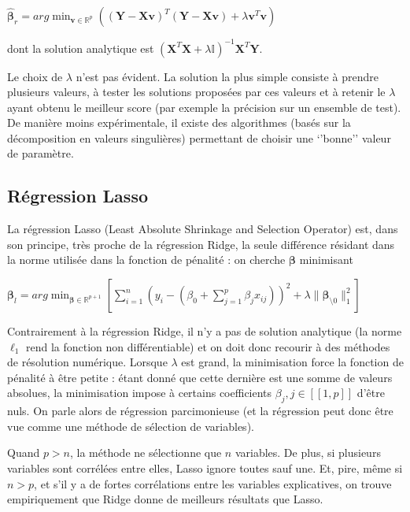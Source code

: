 \documentclass[letterpaper,10pt,english]{jupyterBook}
\begin{document}
\sphinxAtStartPar
\(\hat{\boldsymbol \beta}_r = arg\displaystyle\min_{\mathbf v\in\mathbb{R}^{p}} \left ((\mathbf Y-\mathbf X\mathbf v)^T(\mathbf Y-\mathbf X\mathbf v) + \lambda \mathbf v^T\mathbf v\right )\)

\sphinxAtStartPar
dont la solution analytique est \((\mathbf X^T\mathbf X + \lambda \mathbb{I})^{-1}\mathbf X^T\mathbf Y\).

\sphinxAtStartPar
Le choix de \(\lambda\) n’est pas évident. La solution la plus simple consiste à prendre plusieurs valeurs, à tester les solutions proposées par ces valeurs et à retenir le \(\lambda\) ayant obtenu le meilleur score (par exemple la précision sur un ensemble de test). De manière moins expérimentale, il existe des algorithmes (basés sur la décomposition en valeurs singulières) permettant de choisir une ‘’bonne’’ valeur de paramètre.


\subsection{Régression Lasso}
\label{\detokenize{regression:regression-lasso}}
\ignorespaces 
{}\ignorespaces 
\sphinxAtStartPar
La régression Lasso (Least Absolute Shrinkage and Selection Operator) est, dans son principe, très proche de la régression Ridge, la seule différence résidant dans la norme utilisée dans la fonction de pénalité : on cherche \(\boldsymbol\beta\) minimisant

\sphinxAtStartPar
\(\boldsymbol\beta_l = arg\displaystyle\min_{\boldsymbol\beta\in\mathbb{R}^{p+1}}\left [\displaystyle\sum_{i=1}^n \left (y_i-(\beta_0+\displaystyle\sum_{j=1}^p \beta_j x_{ij})\right )^2+\lambda \| \boldsymbol\beta_{\setminus 0}\|^2_1\right ]\)

\sphinxAtStartPar
Contrairement à la régression Ridge, il n’y a pas de solution analytique (la norme \(\ell_1\) rend la fonction non différentiable) et on doit donc recourir à des méthodes de résolution numérique. Lorsque \(\lambda\) est grand, la minimisation force la fonction de pénalité à être petite : étant donné que cette dernière est une somme de valeurs absolues, la minimisation impose à certains coefficients \(\beta_j,j\in[\![1,p]\!]\) d’être nuls. On parle alors de régression parcimonieuse (et la régression peut donc être vue comme une méthode de sélection de variables).

\sphinxAtStartPar
Quand \(p>n\), la méthode ne sélectionne que \(n\) variables. De plus, si plusieurs variables sont corrélées entre elles, Lasso ignore toutes sauf une. Et, pire, même si \(n>p\), et s’il y a de fortes corrélations entre les variables explicatives, on trouve empiriquement que Ridge donne de meilleurs résultats que Lasso.
\end{document}

